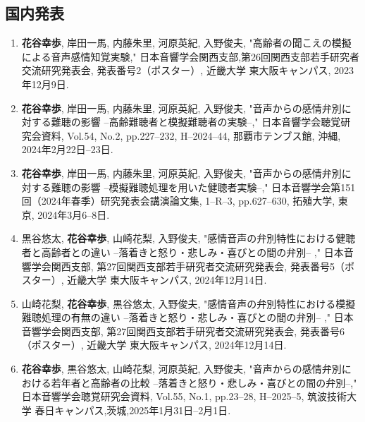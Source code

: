 \documentclass[11pt]{jreport}
\begin{document}
\subsection*{国内発表}
 \begin{enumerate}
    \item \textbf{花谷幸歩}, 岸田一馬, 内藤朱里, 河原英紀, 入野俊夫, 
    "高齢者の聞こえの模擬による音声感情知覚実験," 日本音響学会関西支部,第26回関西支部若手研究者交流研究発表会, 
    発表番号2（ポスター）, 近畿大学 東大阪キャンパス, 2023年12月9日. 
    
    \item \textbf{花谷幸歩}, 岸田一馬, 内藤朱里, 河原英紀, 入野俊夫, 
    "音声からの感情弁別に対する難聴の影響 --高齢難聴者と模擬難聴者の実験--," 日本音響学会聴覚研究会資料,
    Vol.54, No.2, pp.227--232, H--2024--44, 那覇市テンブス館, 沖縄, 2024年2月22日--23日.

    \item \textbf{花谷幸歩}, 岸田一馬, 内藤朱里, 河原英紀, 入野俊夫, 
    "音声からの感情弁別に対する難聴の影響 --模擬難聴処理を用いた健聴者実験--," 日本音響学会第151回（2024年春季）研究発表会講演論文集,
    1--R--3, pp.627--630, 拓殖大学, 東京, 2024年3月6--8日.

    \item 黒谷悠太, \textbf{花谷幸歩}, 山崎花梨, 入野俊夫,
    "感情音声の弁別特性における健聴者と高齢者との違い --落着きと怒り・悲しみ・喜びとの間の弁別-- ," 日本音響学会関西支部, 第27回関西支部若手研究者交流研究発表会,
    発表番号5（ポスター）, 近畿大学 東大阪キャンパス, 2024年12月14日.

    \item 山崎花梨, \textbf{花谷幸歩}, 黒谷悠太, 入野俊夫, 
    "感情音声の弁別特性における模擬難聴処理の有無の違い --落着きと怒り・悲しみ・喜びとの間の弁別-- ," 日本音響学会関西支部, 第27回関西支部若手研究者交流研究発表会,
    発表番号6（ポスター）, 近畿大学 東大阪キャンパス, 2024年12月14日.

    \item \textbf{花谷幸歩}, 黒谷悠太, 山崎花梨, 河原英紀, 入野俊夫, 
    "音声からの感情弁別における若年者と高齢者の比較 --落着きと怒り・悲しみ・喜びとの間の弁別--," 日本音響学会聴覚研究会資料,
    Vol.55, No.1, pp.23--28, H--2025--5, 筑波技術大学 春日キャンパス,茨城,2025年1月31日--2月1日.

 \end{enumerate}
\end{document}

